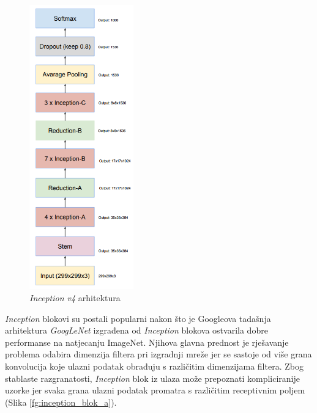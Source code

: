 \documentclass[times, utf8, proizvoljni, numeric]{fer}
\begin{document}
\begin{figure}[!ht]
	\begin{center}
		\captionsetup{justification=centering}
		\includegraphics[width=0.4\textwidth]{./imgs/inceptionv4.png}
		\caption{\textit{Inception v4} arhitektura \cite{Inceptionv4}}
		\label{fg:inceptionv4}
	\end{center}
\end{figure}

\textit{Inception} blokovi su postali popularni nakon što je Googleova tadašnja arhitektura \textit{GoogLeNet} izgrađena od \textit{Inception} blokova ostvarila dobre performanse na natjecanju ImageNet. Njihova glavna prednost je rješavanje problema odabira dimenzija filtera pri izgradnji mreže jer se sastoje od više grana konvolucija koje ulazni podatak obrađuju s različitim dimenzijama filtera. Zbog stablaste razgranatosti, \textit{Inception} blok iz ulaza može prepoznati kompliciranije uzorke jer svaka grana ulazni podatak promatra s različitim receptivnim poljem (Slika \ref{fg:inception_blok_a}).
	
\end{document}

